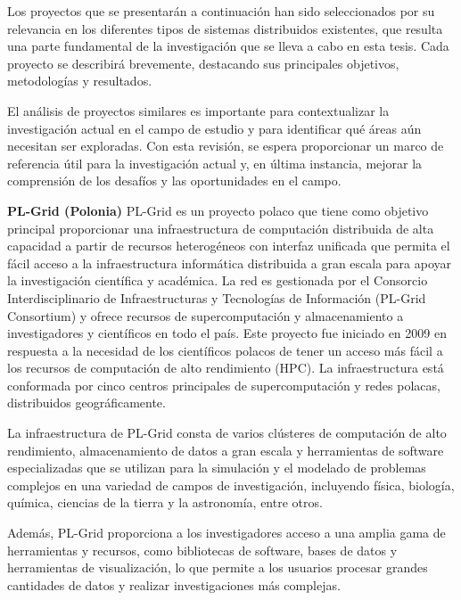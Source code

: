\begin{spacing}{1.5}
\begin{multicols}{2}
  Los proyectos que se presentarán a continuación han sido seleccionados por su relevancia en los diferentes tipos de sistemas distribuidos existentes, que resulta una parte fundamental de la investigación que se lleva a cabo en esta tesis. Cada proyecto se describirá brevemente, destacando sus principales objetivos, metodologías y resultados.

  El análisis de proyectos similares es importante para contextualizar la investigación actual en el campo de estudio y para identificar qué áreas aún necesitan ser exploradas. Con esta revisión, se espera proporcionar un marco de referencia útil para la investigación actual y, en última instancia, mejorar la comprensión de los desafíos y las oportunidades en el campo.

  \vspace{3mm}

\textbf{PL-Grid (Polonia)}
  \newline
  PL-Grid es un proyecto polaco que tiene como objetivo principal proporcionar una infraestructura de computación distribuida de alta capacidad a partir de recursos heterogéneos con interfaz unificada que permita el fácil acceso a la infraestructura informática distribuida a gran escala para apoyar la investigación científica y académica. La red es gestionada por el Consorcio Interdisciplinario de Infraestructuras y Tecnologías de Información (PL-Grid Consortium) y ofrece recursos de supercomputación y almacenamiento a investigadores y científicos en todo el país. Este proyecto fue iniciado en 2009 en respuesta a la necesidad de los científicos polacos de tener un acceso más fácil a los recursos de computación de alto rendimiento (HPC). La infraestructura está conformada por cinco centros principales de supercomputación y redes polacas, distribuidos geográficamente.
  
  La infraestructura de PL-Grid consta de varios clústeres de computación de alto rendimiento, almacenamiento de datos a gran escala y herramientas de software especializadas que se utilizan para la simulación y el modelado de problemas complejos en una variedad de campos de investigación, incluyendo física, biología, química, ciencias de la tierra y la astronomía, entre otros.
  
  Además, PL-Grid proporciona a los investigadores acceso a una amplia gama de herramientas y recursos, como bibliotecas de software, bases de datos y herramientas de visualización, lo que permite a los usuarios procesar grandes cantidades de datos y realizar investigaciones más complejas.
  

\end{multicols}
\end{spacing}
